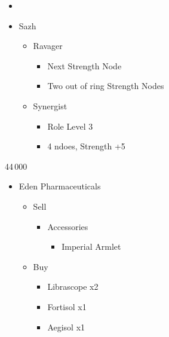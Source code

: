 \begin{menu}
\begin{itemize}
    \paradigm
    \begin{itemize}
        \item {}%
{\paradigmline{\com}{\com}{\med}}%
{\paradigmline{\textit{\com}}{\textit{\com}}{\textit{(\rav)}}}%
{\paradigmline{(\sen)}{(\sen)}{\med}}%
{\paradigmline{(\syn)}{\rav}{\rav}}%
{\paradigmline{\sab}{\rav}{\rav}}%
{\paradigmline{\rav}{\rav}{\rav}}
    \end{itemize}
    \crystarium
    \begin{itemize}
        \item Sazh
        \begin{itemize}
            \item Ravager
            \begin{itemize}
                \item Next Strength Node
                \item Two out of ring Strength Nodes
            \end{itemize}
            \item Synergist
            \begin{itemize}
                \item Role Level 3
                \item 4 ndoes, Strength +5
            \end{itemize}
        \end{itemize}
    \end{itemize}
\end{itemize}
\end{menu}
\begin{shop}{44\,000}
\begin{itemize}
    \item Eden Pharmaceuticals
    \begin{itemize}
        \item Sell
        \begin{itemize}
            \item Accessories
            \begin{itemize}
                \item Imperial Armlet
            \end{itemize}
        \end{itemize}
        \item Buy
        \begin{itemize}
            \item Librascope x2
            \item Fortisol x1
            \item Aegisol x1
        \end{itemize}
    \end{itemize}
\end{itemize}
\end{shop}

